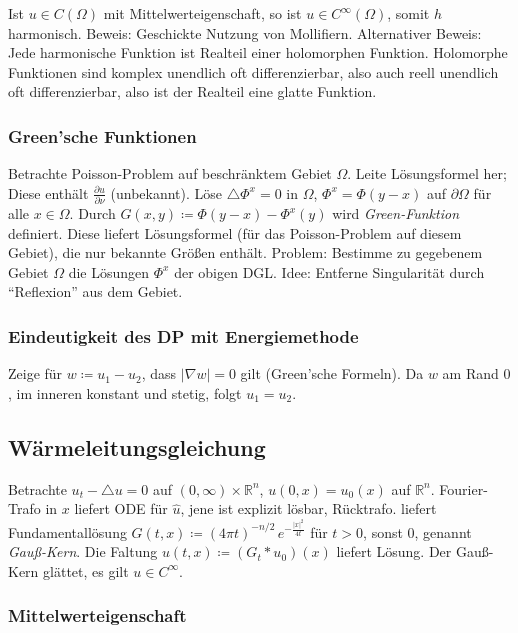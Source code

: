 \documentclass[11pt,a4paper]{scrartcl}
\newcommand{\R}{\mathbb{R}} %
\newcommand{\laplace}{\triangle}
\theoremstyle{plain}
\theoremstyle{definition}
\theoremstyle{remark}
\begin{document}
Ist $u\in C(\Omega)$ mit Mittelwerteigenschaft, so ist $u\in C^\infty(\Omega)$, somit $h$ harmonisch. Beweis: Geschickte Nutzung von Mollifiern. Alternativer Beweis: Jede harmonische Funktion ist Realteil einer holomorphen Funktion. Holomorphe Funktionen sind komplex unendlich oft differenzierbar, also auch reell unendlich oft differenzierbar, also ist der Realteil eine glatte Funktion.

\subsubsection{Green'sche Funktionen}

Betrachte Poisson-Problem auf beschränktem Gebiet $\Omega$. Leite Lösungsformel her; Diese enthält $\frac{\partial u}{\partial \nu}$ (unbekannt). Löse $\laplace \Phi^x = 0$ in $\Omega$, $\Phi^x = \Phi(y-x)$ auf $\partial \Omega$ für alle $x\in\Omega$. Durch $G(x,y)\coloneqq \Phi(y-x)-\Phi^x(y)$ wird \emph{Green-Funktion} definiert. Diese liefert Lösungsformel (für das Poisson-Problem auf diesem Gebiet), die nur bekannte Größen enthält. Problem: Bestimme zu gegebenem Gebiet $\Omega$ die Lösungen $\Phi^x$ der obigen DGL. Idee: Entferne Singularität durch \enquote{Reflexion} aus dem Gebiet.

\subsubsection{Eindeutigkeit des DP mit Energiemethode}

Zeige für $w\coloneqq u_1-u_2$, dass $|\nabla w|=0$ gilt (Green'sche Formeln). Da $w$ am Rand $0$, im inneren konstant und stetig, folgt $u_1=u_2$.

\subsection{Wärmeleitungsgleichung}

Betrachte $u_t-\triangle u = 0$ auf $(0,\infty)\times \R^n$, $u(0,x)=u_0(x)$ auf $\R^n$. Fourier-Trafo in $x$ liefert ODE für $\hat u$, jene ist explizit lösbar, Rücktrafo. liefert Fundamentallösung $G(t,x)\coloneqq (4\pi t)^{-n/2} \, e^{-\frac{|x|^2}{4t}}$ für $t>0$, sonst $0$, genannt \emph{Gauß-Kern}. Die Faltung $u(t,x)\coloneqq (G_t*u_0)(x)$ liefert Lösung. Der Gauß-Kern glättet, es gilt $u\in C^\infty$.

\subsubsection{Mittelwerteigenschaft}
\end{document}
